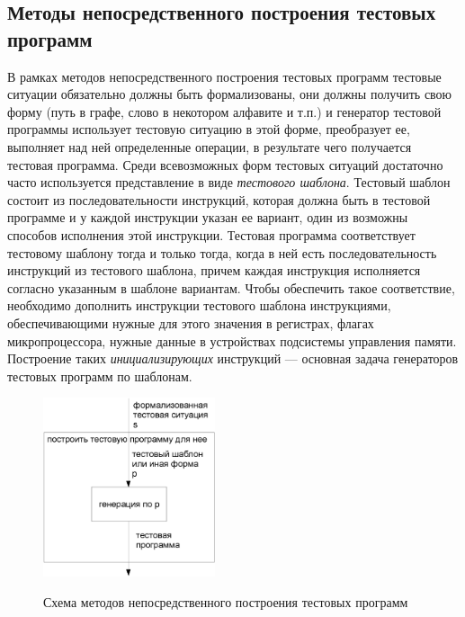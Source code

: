 \subsection{Методы непосредственного построения тестовых\\ программ}

В рамках методов непосредственного построения тестовых программ тестовые ситуации обязательно должны быть формализованы, они должны получить свою форму (путь в графе, слово в некотором алфавите и т.п.) и генератор тестовой программы использует тестовую ситуацию в этой форме, преобразует ее, выполняет над ней определенные операции, в результате чего получается тестовая программа. Среди всевозможных форм тестовых ситуаций достаточно часто используется представление в виде \emph{тестового шаблона}. Тестовый шаблон состоит из последовательности инструкций, которая должна быть в тестовой программе и у каждой инструкции указан ее вариант, один из возможны способов исполнения этой инструкции. Тестовая программа соответствует тестовому шаблону тогда и только тогда, когда в ней  есть последовательность инструкций из тестового шаблона, причем каждая инструкция исполняется согласно указанным в шаблоне вариантам. Чтобы обеспечить такое соответствие, необходимо дополнить инструкции тестового шаблона инструкциями, обеспечивающими нужные для этого значения в регистрах, флагах микропроцессора, нужные данные в устройствах подсистемы управления памяти. Построение таких \emph{инициализирующих} инструкций --- основная задача генераторов тестовых программ по шаблонам.

\begin{figure}[h] \center
  \includegraphics[width=0.45\textwidth]{1.review/im_methods}\\
  \caption{Схема методов непосредственного построения тестовых программ}\label{fig:immediate_methods}
\end{figure}

